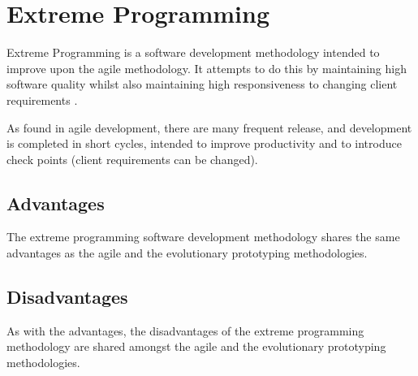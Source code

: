 \section{Extreme Programming}
Extreme Programming is a software development methodology intended to improve 
upon the agile methodology. It attempts to do this by maintaining high software 
quality whilst also maintaining high responsiveness to changing client 
requirements \citep{knott_dawson99}.

As found in agile development, there are many frequent release, and development 
is completed in short cycles, intended to improve productivity and to introduce 
check points (client requirements can be changed).

\subsection{Advantages}
The extreme programming software development methodology shares the same 
advantages as the agile and the evolutionary prototyping methodologies.

\subsection{Disadvantages}
As with the advantages, the disadvantages of the extreme programming methodology 
are shared amongst the agile and the evolutionary prototyping methodologies.